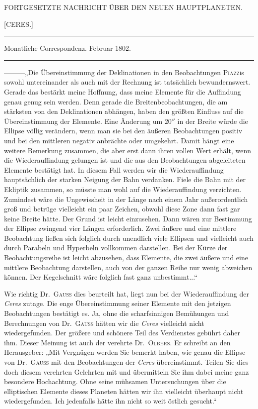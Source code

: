 \bigskip{}
\begin{center}
{\small FORTGESETZTE NACHRICHT ÜBER DEN NEUEN HAUPTPLANETEN.\par}
[CERES.]\par
\medskip\hrule\medskip
Monatliche Correspondenz. Februar 1802.\par
\medskip\hrule
\end{center}\medskip
—\quad —\quad —\quad „Die Übereinstimmung der Deklinationen in den Beobachtungen \textsc{Piazzi}s sowohl untereinander als auch mit der Rechnung ist tatsächlich bewundernswert. Gerade das bestärkt meine Hoffnung, dass meine Elemente für die Auffindung genau genug sein werden. Denn gerade die Breitenbeobachtungen, die am stärksten von den Deklinationen abhängen, haben den größten Einfluss auf die Übereinstimmung der Elemente. Eine Änderung um $20''$ in der Breite würde die Ellipse völlig verändern, wenn man sie bei den äußeren Beobachtungen positiv und bei den mittleren negativ anbrächte oder umgekehrt. Damit hängt eine weitere Bemerkung zusammen, die aber erst dann ihren vollen Wert erhält, wenn die Wiederauffindung gelungen ist und die aus den Beobachtungen abgeleiteten Elemente bestätigt hat. In diesem Fall werden wir die Wiederauffindung hauptsächlich der starken Neigung der Bahn verdanken. Fiele die Bahn mit der Ekliptik zusammen, so müsste man wohl auf die Wiederauffindung verzichten. Zumindest wäre die Ungewissheit in der Länge nach einem Jahr außerordentlich groß und betrüge vielleicht ein paar Zeichen, obwohl diese Zone dann fast gar keine Breite hätte. Der Grund ist leicht einzusehen. Dann wären zur Bestimmung der Ellipse zwingend vier Längen erforderlich. Zwei äußere und eine mittlere Beobachtung ließen sich folglich durch unendlich viele Ellipsen und vielleicht auch durch Parabeln und Hyperbeln vollkommen darstellen. Bei der Kürze der Beobachtungsreihe ist leicht abzusehen,
%
dass Elemente, die zwei äußere und eine mittlere Beobachtung darstellen, auch von der ganzen Reihe nur wenig abweichen können. Der Kegelschnitt wäre folglich fast ganz unbestimmt...“

Wie richtig Dr.\ \textsc{Gauss} dies beurteilt hat, liegt nun bei der Wiederauffindung der \textit{Ceres} zutage. Die enge Übereinstimmung seiner Elemente mit den jetzigen Beobachtungen bestätigt es. Ja, ohne die scharfsinnigen Bemühungen und Berechnungen von Dr.\ \textsc{Gauss} hätten wir die \textit{Ceres} vielleicht nicht wiedergefunden. Der größere und schönere Teil des Verdienstes gebührt daher ihm. Dieser Meinung ist auch der verehrte Dr.\ \textsc{Olbers}. Er schreibt an den Herausgeber: „Mit Vergnügen werden Sie bemerkt haben, wie genau die Ellipse von Dr.\ \textsc{Gauss} mit den Beobachtungen der \textit{Ceres} übereinstimmt. Teilen Sie dies doch diesem verehrten Gelehrten mit und übermitteln Sie ihm dabei meine ganz besondere Hochachtung. Ohne seine mühsamen Untersuchungen über die elliptischen Elemente dieses Planeten hätten wir ihn vielleicht überhaupt nicht wiedergefunden. Ich jedenfalls hätte ihn nicht so weit östlich gesucht.“
\begin{flushright}\end{flushright}

